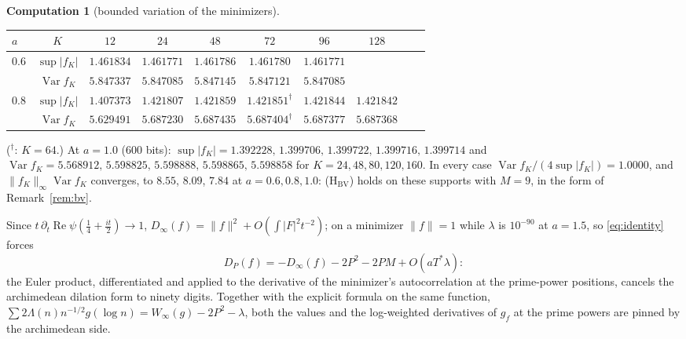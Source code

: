 \documentclass[11pt]{article}
\theoremstyle{definition}
\newtheorem{computation}[theorem]{Computation}
\theoremstyle{remark}
\DeclareMathOperator{\Ree}{Re}
\newcommand{\Tst}{T^{*}}
\begin{document}
\begin{computation}[bounded variation of the minimizers]
\begin{center}
\begin{tabular}{@{}lccccccccc@{}}
\toprule
$a$ & $K$ & $12$ & $24$ & $48$ & $72$ & $96$ & $128$\\
\midrule
$0.6$ & $\sup|f_K|$ & $1.461834$ & $1.461771$ & $1.461786$ & $1.461780$ & $1.461771$ & \\
      & $\operatorname{Var}f_K$ & $5.847337$ & $5.847085$ & $5.847145$ & $5.847121$ & $5.847085$ & \\
$0.8$ & $\sup|f_K|$ & $1.407373$ & $1.421807$ & $1.421859$ & $1.421851^{\dagger}$ & $1.421844$ & $1.421842$\\
      & $\operatorname{Var}f_K$ & $5.629491$ & $5.687230$ & $5.687435$ & $5.687404^{\dagger}$ & $5.687377$ & $5.687368$\\
\bottomrule
\end{tabular}
\end{center}
($^{\dagger}$: $K=64$.) At $a=1.0$ ($600$ bits): $\sup|f_K|=1.392228,\,1.399706,\,1.399722,\,1.399716,\,1.399714$ and $\operatorname{Var}f_K=5.568912,\,5.598825,\,5.598888,\,5.598865,\,5.598858$ for $K=24,48,80,120,160$. In every case $\operatorname{Var}f_K/(4\sup|f_K|)=1.0000$, and $\|f_K\|_\infty\operatorname{Var}f_K$ converges, to $8.55$, $8.09$, $7.84$ at $a=0.6,0.8,1.0$: (H$_{\mathrm{BV}}$) holds on these supports with $M=9$, in the form of Remark~\ref{rem:bv}.
\end{computation}

Since $t\,\partial_t\Ree\psi(\tfrac14+\tfrac{it}2)\to1$, $D_\infty(f)=\|f\|^2+O(\int|F|^2t^{-2})$; on a minimizer $\|f\|=1$ while $\lambda$ is $10^{-90}$ at $a=1.5$, so \eqref{eq:identity} forces
\begin{equation}\label{eq:cancel}
D_P(f)=-D_\infty(f)-2P^2-2PM+O(a\Tst\lambda):
\end{equation}
the Euler product, differentiated and applied to the derivative of the minimizer's autocorrelation at the prime-power positions, cancels the archimedean dilation form to ninety digits. Together with the explicit formula on the same function, $\sum 2\Lambda(n)n^{-1/2}g(\log n)=W_\infty(g)-2P^2-\lambda$, both the values and the log-weighted derivatives of $g_f$ at the prime powers are pinned by the archimedean side.
\end{document}
